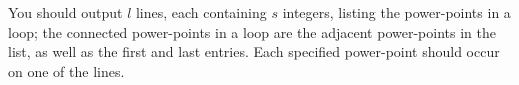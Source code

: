You should output $l$ lines, each containing $s$ integers, listing the power-points
in a loop; the connected power-points in a loop are the adjacent power-points in
the list, as well as the first and last entries. Each specified power-point should
occur on one of the lines.
